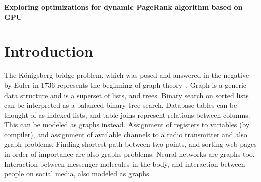 \begin{center}
\Large
\textbf{Exploring optimizations for dynamic PageRank algorithm based on GPU \\}
\vspace{5.0ex}
\end{center}

\section{Introduction}

The Königsberg bridge problem, which was posed and answered in the negative by Euler in
1736 represents the beginning of graph theory~\cite{euler}. Graph is a generic data structure and is a
superset of lists, and trees. Binary search on sorted lists can be interpreted as a balanced
binary tree search. Database tables can be thought of as indexed lists, and table joins
represent relations between columns. This can be modeled as graphs instead. Assignment
of registers to variables (by compiler), and assignment of available channels to a radio
transmitter and also graph problems. Finding shortest path between two points, and
sorting web pages in order of importance are also graphs problems. Neural networks are
graphs too. Interaction between messenger molecules in the body, and interaction between
people on social media, also modeled as graphs.